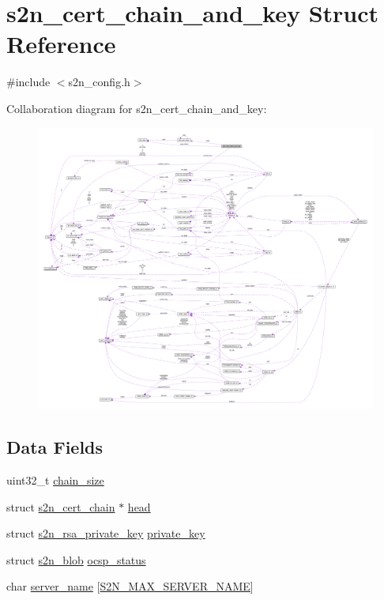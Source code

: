 \hypertarget{structs2n__cert__chain__and__key}{}\section{s2n\+\_\+cert\+\_\+chain\+\_\+and\+\_\+key Struct Reference}
\label{structs2n__cert__chain__and__key}


{\ttfamily \#include $<$s2n\+\_\+config.\+h$>$}



Collaboration diagram for s2n\+\_\+cert\+\_\+chain\+\_\+and\+\_\+key\+:\nopagebreak
\begin{figure}[H]
\begin{center}
\leavevmode
\includegraphics[width=350pt]{structs2n__cert__chain__and__key__coll__graph}
\end{center}
\end{figure}
\subsection*{Data Fields}
\begin{DoxyCompactItemize}
\item 
uint32\+\_\+t \hyperlink{structs2n__cert__chain__and__key_af6903d14cb3f4627a8cfe70d368b1413}{chain\+\_\+size}
\item 
struct \hyperlink{structs2n__cert__chain}{s2n\+\_\+cert\+\_\+chain} $\ast$ \hyperlink{structs2n__cert__chain__and__key_a006e23cea0adf1733edba58ea15cd7ed}{head}
\item 
struct \hyperlink{structs2n__rsa__private__key}{s2n\+\_\+rsa\+\_\+private\+\_\+key} \hyperlink{structs2n__cert__chain__and__key_a849e4c18d4d5c98a2ae6eb3c1983e060}{private\+\_\+key}
\item 
struct \hyperlink{structs2n__blob}{s2n\+\_\+blob} \hyperlink{structs2n__cert__chain__and__key_a4baf31cc326e006017c66fe41b4194d6}{ocsp\+\_\+status}
\item 
char \hyperlink{structs2n__cert__chain__and__key_a4ab39d5bc6a649110722ddcde959aeb9}{server\+\_\+name} \mbox{[}\hyperlink{s2n__config_8h_ac44565170294b74f687996bbc2beba63}{S2\+N\+\_\+\+M\+A\+X\+\_\+\+S\+E\+R\+V\+E\+R\+\_\+\+N\+A\+ME}\mbox{]}
\end{DoxyCompactItemize}


